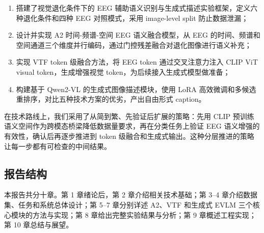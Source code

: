 \begin{enumerate}
  \item 搭建了视觉退化条件下的 EEG 辅助语义识别与生成式描述实验框架，定义六种退化条件和四种 EEG 对照模式，采用 image-level split 防止数据泄漏；
  \item 设计并实现 A2 时间-频谱-空间 EEG 语义融合模型，从 EEG 的时间、频谱和空间通道三个维度并行编码，通过门控残差融合对退化图像进行语义补充；
  \item 实现 VTF token 级融合方法，将 EEG token 通过交叉注意力注入 CLIP ViT visual token，生成增强视觉 token，为后续接入生成式模型做准备；
  \item 构建基于 Qwen2-VL 的生成式图像描述模块，使用 LoRA 高效微调和多候选重排序，对比五种技术方案的优劣，产出自由形式 caption。
\end{enumerate}

在技术路线上，我们采用了从简到繁、先验证后扩展的策略：先用 CLIP 预训练语义空间作为跨模态桥梁降低数据量要求，再在分类任务上验证 EEG 语义增强的有效性，确认后再逐步推进到 token 级融合和生成式输出。这种分层推进的策略让每一步都有可检查的中间结果。

\subsection{报告结构}

本报告共分十章。第 1 章绪论后，第 2 章介绍相关技术基础；第 3--4 章介绍数据集、任务和系统总体设计；第 5--7 章分别详述 A2、VTF 和生成式 EVLM 三个核心模块的方法与实现；第 8 章给出完整实验结果与分析；第 9 章概述工程实现；第 10 章总结与展望。
